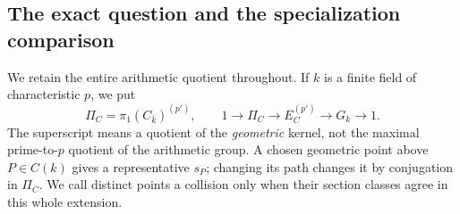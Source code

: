 \subsection{The exact question and the specialization comparison}

We retain the entire arithmetic quotient throughout.  If $k$ is a finite
field of characteristic $p$, we put
\[
 \Pi_C=\pi_1(C_{\bar k})^{(p')},\qquad
 1\longrightarrow\Pi_C\longrightarrow E_C^{(p')}
       \longrightarrow G_k\longrightarrow1.
\]
The superscript means a quotient of the \emph{geometric} kernel, not the
maximal prime-to-$p$ quotient of the arithmetic group.  A chosen geometric
point above $P\in C(k)$ gives a representative $s_P$; changing its path
changes it by conjugation in $\Pi_C$.  We call distinct points a collision
only when their section classes agree in this whole extension.

